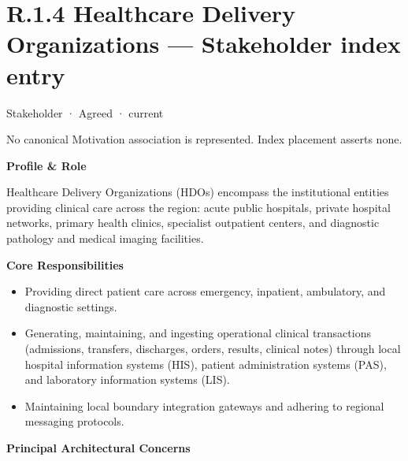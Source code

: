 \section*{R.1.4 Healthcare Delivery Organizations — Stakeholder index entry}
\label{navigation:R.1.4}

\label{element:31a8e1054c02483a9d5e314a91a91364}
{\small Stakeholder · Agreed · current}\par
No canonical Motivation association is represented. Index placement asserts none.\par

\par\medskip\textbf{Profile \& Role}\par


Healthcare Delivery Organizations (HDOs) encompass the institutional entities providing clinical care across the region: acute public hospitals, private hospital networks, primary health clinics, specialist outpatient centers, and diagnostic pathology and medical imaging facilities.



\par\medskip\textbf{Core Responsibilities}\par


\begin{itemize}


\item Providing direct patient care across emergency, inpatient, ambulatory, and diagnostic settings.

\item Generating, maintaining, and ingesting operational clinical transactions (admissions, transfers, discharges, orders, results, clinical notes) through local hospital information systems (HIS), patient administration systems (PAS), and laboratory information systems (LIS).

\item Maintaining local boundary integration gateways and adhering to regional messaging protocols.

\end{itemize}


\par\medskip\textbf{Principal Architectural Concerns}\par


